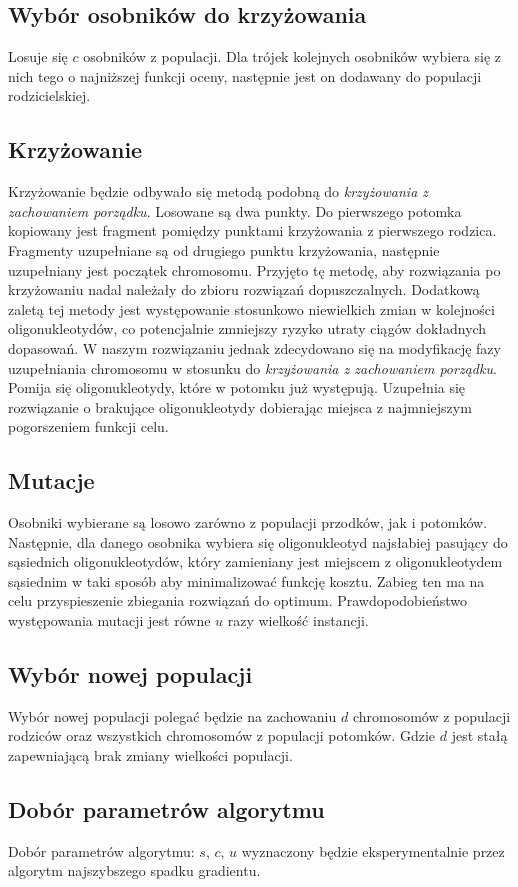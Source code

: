 \documentclass{article}
\begin{document}
\subsection{Wybór osobników do krzyżowania}
Losuje się $c$ osobników z populacji.
Dla trójek kolejnych osobników wybiera się z nich tego o najniższej funkcji oceny, następnie jest on dodawany do populacji rodzicielskiej.
\subsection{Krzyżowanie}
Krzyżowanie będzie odbywało się metodą podobną do \textit{krzyżowania z zachowaniem porządku}.
Losowane są dwa punkty. Do pierwszego potomka kopiowany jest fragment pomiędzy punktami krzyżowania z pierwszego rodzica.
Fragmenty uzupełniane są od drugiego punktu krzyżowania, następnie uzupełniany jest początek chromosomu. Przyjęto tę metodę, aby rozwiązania po krzyżowaniu nadal należały do zbioru rozwiązań dopuszczalnych. Dodatkową zaletą tej metody jest występowanie stosunkowo niewielkich  zmian w kolejności oligonukleotydów, co potencjalnie zmniejszy ryzyko utraty ciągów dokładnych dopasowań. W naszym rozwiązaniu jednak zdecydowano się na modyfikację fazy uzupełniania chromosomu w stosunku do \textit{krzyżowania z zachowaniem porządku}. 
Pomija się oligonukleotydy, które w potomku już występują.
Uzupełnia się rozwiązanie o brakujące oligonukleotydy dobierając miejsca z najmniejszym pogorszeniem funkcji celu.
\subsection{Mutacje}
Osobniki wybierane są losowo zarówno z populacji przodków, jak i potomków. Następnie, dla danego osobnika wybiera się oligonukleotyd najsłabiej pasujący do sąsiednich oligonukleotydów, który zamieniany jest miejscem z oligonukleotydem sąsiednim w taki sposób aby minimalizować funkcję kosztu. Zabieg ten ma na celu przyspieszenie zbiegania rozwiązań do optimum. Prawdopodobieństwo występowania mutacji jest równe $u$ razy wielkość instancji.
\subsection{Wybór nowej populacji}
Wybór nowej populacji polegać będzie na zachowaniu $d$ chromosomów z populacji rodziców oraz wszystkich chromosomów z populacji potomków. Gdzie $d$ jest stałą zapewniającą brak zmiany wielkości populacji.
\subsection{Dobór parametrów algorytmu}
Dobór parametrów algorytmu:
$s$,
$c$,
$u$
wyznaczony będzie eksperymentalnie przez algorytm najszybszego spadku gradientu.
\end{document}
